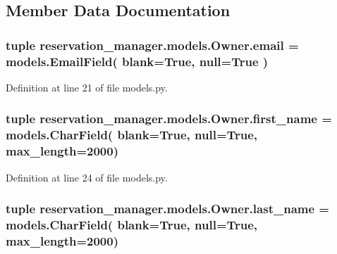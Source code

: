 \subsection{Member Data Documentation}
\hypertarget{classreservation__manager_1_1models_1_1Owner_a590ba8cdf753645e9d8654a361dc724c}{
\subsubsection[{email}]{\setlength{\rightskip}{0pt plus 5cm}tuple reservation\-\_\-manager.\-models.\-Owner.\-email = models.\-Email\-Field( blank=True, null=True )\hspace{0.3cm}{\ttfamily [static]}}}\label{classreservation__manager_1_1models_1_1Owner_a590ba8cdf753645e9d8654a361dc724c}


Definition at line 21 of file models.\-py.

\hypertarget{classreservation__manager_1_1models_1_1Owner_ab12cc2e4b6cded5058da43e44f968eb6}{
\subsubsection[{first\-\_\-name}]{\setlength{\rightskip}{0pt plus 5cm}tuple reservation\-\_\-manager.\-models.\-Owner.\-first\-\_\-name = models.\-Char\-Field( blank=True, null=True, max\-\_\-length=2000)\hspace{0.3cm}{\ttfamily [static]}}}\label{classreservation__manager_1_1models_1_1Owner_ab12cc2e4b6cded5058da43e44f968eb6}


Definition at line 24 of file models.\-py.

\hypertarget{classreservation__manager_1_1models_1_1Owner_a812644470df6789464d7cd461d7692a7}{
\subsubsection[{last\-\_\-name}]{\setlength{\rightskip}{0pt plus 5cm}tuple reservation\-\_\-manager.\-models.\-Owner.\-last\-\_\-name = models.\-Char\-Field( blank=True, null=True, max\-\_\-length=2000)\hspace{0.3cm}{\ttfamily [static]}}}\label{classreservation__manager_1_1models_1_1Owner_a812644470df6789464d7cd461d7692a7}


